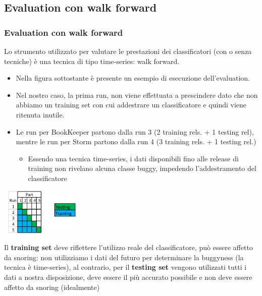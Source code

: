 \documentclass{beamer}
\begin{document}
\subsection{Evaluation con walk forward}
\begin{frame}
	\frametitle{Evaluation con walk forward}
	
	\fontsize{9pt}{10pt}\selectfont
	
	Lo strumento utilizzato per valutare le prestazioni dei classificatori (con o senza tecniche) è
	una tecnica di tipo time-series: walk forward.
	
	\begin{itemize}
		\item Nella figura sottostante è presente un esempio di esecuzione dell'evaluation.
	
		\item Nel nostro caso, la prima run, non viene effettuata a prescindere dato che non abbiamo un training set con cui addestrare
		un classificatore e quindi viene ritenuta inutile.
		\item Le run per BookKeeper partono dalla run 3 
		(2 training rels. + 1 testing rel), 
		mentre le run per Storm partono dalla run 4 (3 training rels.  + 1 testing rel.)
		\begin{itemize}
			\item Essendo una tecnica time-series, i dati disponibili fino alle release di training non rivelano
			alcuna classe buggy, impedendo l'addestramento del classificatore
		\end{itemize}
	\end{itemize}
	
	\begin{center}
	\includegraphics[width=4cm, height=2.25cm]{walkforward}
	\end{center}
	
	\fontsize{8pt}{10pt}\selectfont
	
	Il \textbf{training set} deve riflettere l'utilizzo reale del classificatore, 
	può essere affetto da snoring: non utilizziamo i dati del futuro per determinare 
	la buggyness (la tecnica è time-series), al contrario, per il \textbf{testing set}
	vengono utilizzati tutti i dati a nostra disposizione, deve essere
	il più accurato possibile e non deve essere affetto da snoring (idealmente)
\end{frame}
\end{document}
